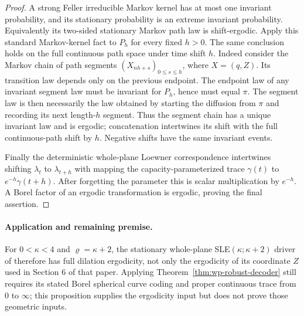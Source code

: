 \documentclass[11pt]{article}
\theoremstyle{definition}\newtheorem{definition}[theorem]{Definition}
\theoremstyle{remark}\newtheorem{remark}[theorem]{Remark}
\begin{document}
\begin{proof}
A strong Feller irreducible Markov kernel has at most one invariant
probability, and its stationary probability is an extreme invariant
probability.  Equivalently its two-sided stationary Markov path
law is shift-ergodic.  Apply this standard Markov-kernel fact to
$P_h$ for every fixed $h>0$.  The same conclusion holds on the
full continuous path space under time shift $h$.  Indeed consider
the Markov chain of path segments $(X_{nh+s})_{0\le s\le h}$,
where $X=(q,Z)$.  Its transition law depends only on the previous
endpoint.  The endpoint law of any invariant segment law must be
invariant for $P_h$, hence must equal $\pi$.  The segment law is
then necessarily the law obtained by starting the diffusion from
$\pi$ and recording its next length-$h$ segment.  Thus the segment
chain has a unique invariant law and is ergodic; concatenation
intertwines its shift with the full continuous-path shift by $h$.
Negative shifts have the same invariant events.

Finally the deterministic whole-plane Loewner correspondence
intertwines shifting $\lambda_t$ to $\lambda_{t+h}$ with mapping
the capacity-parameterized trace $\gamma(t)$ to
$e^{-h}\gamma(t+h)$.  After forgetting the parameter this is
scalar multiplication by $e^{-h}$.  A Borel factor of an ergodic
transformation is ergodic, proving the final assertion.
\end{proof}

\paragraph{Application and remaining premise.}
For $0<\kappa<4$ and $\varrho=\kappa+2$, the stationary
whole-plane SLE$(\kappa;\kappa+2)$ driver of
\cite[Section 3]{zhan-tip} therefore has full dilation ergodicity,
not only the ergodicity of its coordinate $Z$ used in Section 6
of that paper.  Applying Theorem~\ref{thm:wp-robust-decoder} still
requires its stated Borel spherical curve coding and proper
continuous trace from $0$ to $\infty$; this proposition supplies
the ergodicity input but does not prove those geometric inputs.
\end{document}
